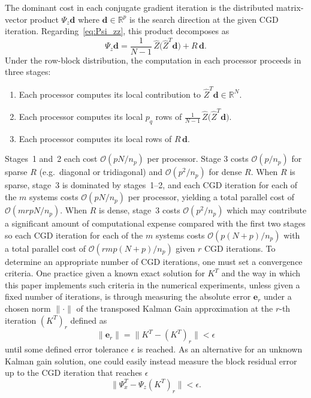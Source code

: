 \documentclass[11p]{elsarticle}
\numberwithin{equation}{section}
\newcommand{\vect}[1]{\ensuremath{\bm{#1}}}
\begin{document}
 The dominant cost in each conjugate gradient iteration is the distributed matrix-vector product $\Psi_z \vect{d}$ where $\vect{d} \in \mathbb{R}^p$ is the search direction at the given CGD iteration.
        Regarding~\eqref{eq:Psi_zz}, this product decomposes as
    \begin{equation}\label{eq:matvec_decomp}
      \Psi_z \vect{d}
      = \frac{1}{N-1}\,\widehat{Z}\bigl(\widehat{Z}^T \vect{d}\bigr) + R\,\vect{d}.
    \end{equation}
    Under the row-block distribution, the computation in each processor proceeds in three stages:
    \begin{enumerate}
      \item Each processor computes its local contribution to
        $\widehat{Z}^T \vect{d} \in \mathbb{R}^N$.
      \item Each processor computes its local $p_q$ rows of
        $\frac{1}{N-1}\,\widehat{Z}\bigl(\widehat{Z}^T \vect{d}\bigr)$.
      \item Each processor computes its local rows of $R\,\vect{d}$. 
    \end{enumerate}
    Stages~1 and~2 each cost $\mathcal{O}(pN/n_p)$ per processor.  Stage 3 costs $\mathcal{O}(p/n_p)$ for sparse $R$ (e.g.\ diagonal or tridiagonal) and $\mathcal{O}(p^2/n_p)$ for dense $R$.
    When $R$ is sparse, stage~3 is dominated by stages~1--2,
    and each CGD iteration for each of the $m$ systems costs $\mathcal{O}(pN/n_p)$ per processor,
    yielding a total parallel cost of $\mathcal{O}(mrpN/n_p)$.
    When $R$ is dense, stage~3 costs $\mathcal{O}(p^2/n_p)$ which may contribute a significant amount of computational expense compared with the first two stages so each CGD iteration for each of the $m$ systems costs $\mathcal{O}(p(N+p)/n_p)$ with a total parallel cost of $\mathcal{O}(rmp(N+p)/ n_p)$ {given $r$ CGD iterations.  To determine an appropriate number of CGD iterations, one must set a convergence criteria.  One practice given a known exact solution for $K^T$ and the way in which this paper implements such criteria in the numerical experiments, unless given a fixed number of iterations, is through measuring the absolute error $\vect{e}_r$ under a chosen norm $\|\cdot\|$ of the transposed Kalman Gain approximation at the $r$-th iteration $(K^T)_r$ defined as 
    \begin{equation}
        \|\vect{e}_r\| = \|K^T - (K^T)_r\|  < \epsilon
    \end{equation}
    until some defined error tolerance $\epsilon$ is reached.  As an alternative for an unknown Kalman gain solution, one could easily instead measure the block residual error up to the CGD iteration that reaches $\epsilon$
    \begin{equation}
         \|\Psi_x^T - \Psi_z (K^T)_r\|  < \epsilon.
    \end{equation}}
\end{document}
